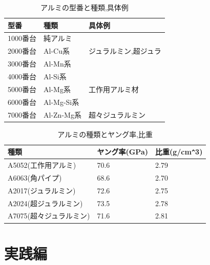 \documentclass[b5paper, 9pt, twocolumn, titlepage,openany]{jsbook}%
\begin{document}
\begin{table}[htb]
  \begin{center}
    \caption{アルミの型番と種類,具体例}
    \begin{tabular}{|l|l|l|} \hline
      型番 & 種類 & 具体例 \\ \hline
      1000番台& 純アルミ &  \\ \hline
      2000番台& Al-Cu系 & ジュラルミン,超ジュラ \\ \hline
      3000番台& Al-Mn系 &  \\ \hline
      4000番台& Al-Si系 &  \\ \hline
      5000番台& Al-Mg系 & 工作用アルミ材 \\ \hline
      6000番台& Al-Mg-Si系 &  \\ \hline
      7000番台& Al-Zn-Mg系 & 超々ジュラルミン \\ \hline
    \end{tabular}
    \label{alminium_num_table}
  \end{center}
\end{table}

\begin{table}[htb]
  \begin{center}
    \caption{アルミの種類とヤング率,比重}
    \begin{tabular}{|l|l|l|} \hline
      種類 & ヤング率(GPa) & 比重(g/cm\verb|^|3) \\ \hline
      A5052(工作用アルミ)& 70.6 & 2.79 \\ \hline
      A6063(角パイプ)& 68.6 & 2.70 \\ \hline
      A2017(ジュラルミン)& 72.6 & 2.75 \\ \hline
      A2024(超ジュラルミン)& 73.5 & 2.78 \\ \hline
      A7075(超々ジュラルミン)& 71.6 & 2.81 \\ \hline
    \end{tabular}
    \label{alminium_num_table}
  \end{center}
\end{table}


\chapter{実践編}
\end{document}
